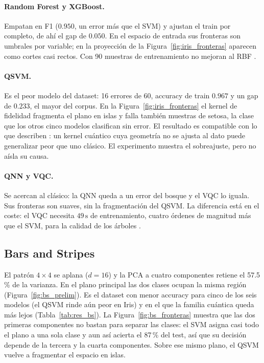 \paragraph{Random Forest y XGBoost.} Empatan en F1 ($0.950$, un error más que el SVM) y ajustan el train por completo, de ahí el gap de $0.050$. En el espacio de entrada sus fronteras son umbrales por variable; en la proyección de la Figura~\ref{fig:iris_fronteras} aparecen como cortes casi rectos. Con 90 muestras de entrenamiento no mejoran al RBF \citep{breiman2001, chen2016}.

\paragraph{QSVM.} Es el peor modelo del dataset: 16 errores de 60, accuracy de train $0.967$ y un gap de $0.233$, el mayor del corpus. En la Figura~\ref{fig:iris_fronteras} el kernel de fidelidad fragmenta el plano en islas y falla también muestras de setosa, la clase que los otros cinco modelos clasifican sin error. El resultado es compatible con lo que describen \citet{huang2021}: un kernel cuántico cuya geometría no se ajusta al dato puede generalizar peor que uno clásico. El experimento muestra el sobreajuste, pero no aísla su causa.

\paragraph{QNN y VQC.} Se acercan al clásico: la QNN queda a un error del bosque y el VQC lo iguala. Sus fronteras son suaves, sin la fragmentación del QSVM. La diferencia está en el coste: el VQC necesita $49\,\mathrm{s}$ de entrenamiento, cuatro órdenes de magnitud más que el SVM, para la calidad de los árboles \citep{cerezo2021, bowles2024}.

\subsection{Bars and Stripes}

El patrón $4\times 4$ se aplana ($d=16$) y la PCA a cuatro componentes retiene el 57.5\,\% de la varianza. En el plano principal las dos clases ocupan la misma región (Figura~\ref{fig:bs_prelim}). Es el dataset con menor accuracy para cinco de los seis modelos (el QSVM rinde aún peor en Iris) y en el que la familia cuántica queda más lejos (Tabla~\ref{tab:res_bs}). La Figura~\ref{fig:bs_fronteras} muestra que las dos primeras componentes no bastan para separar las clases: el SVM asigna casi todo el plano a una sola clase y aun así acierta el 87\,\% del test, así que su decisión depende de la tercera y la cuarta componentes. Sobre ese mismo plano, el QSVM vuelve a fragmentar el espacio en islas.

